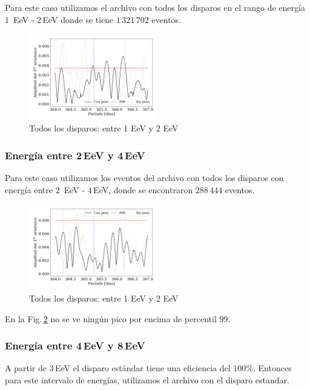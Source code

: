 Para este caso utilizamos el archivo con todos los disparos en el rango de energía $1\,$ EeV - $2\,$EeV donde se tiene $1\,321\,702$ eventos.

\begin{figure}[H]
	\centering
	\includegraphics[width=0.5\textwidth]{2019_AllTriggers_1_2_EeV_con_vs_sin_peso.png}
	\caption{Todos los disparos: entre 1 EeV y 2 EeV}
	\label{fig:12w}
\end{figure}

\subsubsection{Energía entre 2\,EeV y 4\,EeV}

Para este caso utilizamos los eventos del archivo con todos los disparos con energía entre $2\,$ EeV - $4\,$EeV, donde se encontraron $288\,444$ eventos.
\begin{figure}[H]
	\centering
	\includegraphics[width=0.5\textwidth]{2019_AllTriggers_2_4_EeV_con_vs_sin_peso.png}
	\caption{Todos los disparos: entre 1 EeV y 2 EeV}
	\label{fig:24w}
\end{figure}

En la Fig.\,\ref{fig:24w} no se ve ningún pico por encima de  percentil 99.


\subsubsection{Energía entre 4\,EeV y 8\,EeV}

A partir de $3\,$EeV el disparo estándar tiene una eficiencia del $100\%$. Entonces para este  intervalo de energías,  utilizamos el archivo con el disparo estandar.

